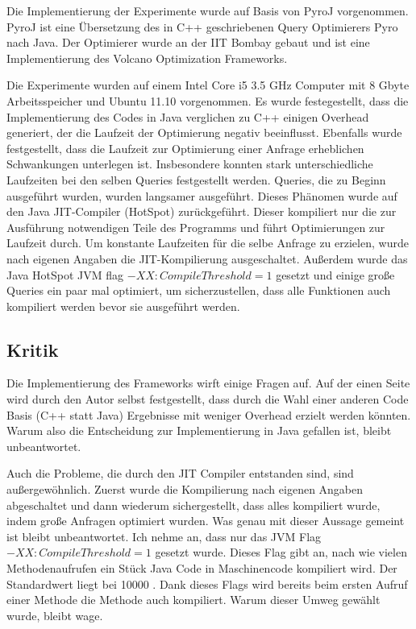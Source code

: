 Die Implementierung der Experimente wurde auf Basis von PyroJ vorgenommen. PyroJ ist eine Übersetzung des in C++ geschriebenen Query Optimierers Pyro nach Java. Der Optimierer wurde an der IIT Bombay gebaut und ist eine Implementierung des Volcano Optimization Frameworks.

Die Experimente wurden auf einem Intel Core i5 3.5 GHz Computer mit 8 Gbyte Arbeitsspeicher und Ubuntu 11.10 vorgenommen. Es wurde festegestellt, dass die Implementierung des Codes in Java verglichen zu C++ einigen Overhead generiert, der die Laufzeit der Optimierung negativ beeinflusst. Ebenfalls wurde festgestellt, dass die Laufzeit zur Optimierung einer Anfrage erheblichen Schwankungen unterlegen ist. Insbesondere konnten stark unterschiedliche Laufzeiten bei den selben Queries festgestellt werden. Queries, die zu Beginn ausgeführt wurden, wurden langsamer ausgeführt. Dieses Phänomen wurde auf den Java JIT-Compiler (HotSpot) zurückgeführt. Dieser kompiliert nur die zur Ausführung notwendigen Teile des Programms und führt Optimierungen zur Laufzeit durch. Um konstante Laufzeiten für die selbe Anfrage zu erzielen, wurde nach eigenen Angaben die JIT-Kompilierung ausgeschaltet. Außerdem wurde das Java HotSpot JVM flag $-XX:CompileThreshold=1$ gesetzt und einige große Queries ein paar mal optimiert, um sicherzustellen, dass alle Funktionen auch kompiliert werden bevor sie ausgeführt werden.
 

\subsection{Kritik} 


Die Implementierung des Frameworks wirft einige Fragen auf. Auf der einen Seite wird durch den Autor selbst festgestellt, dass durch die Wahl einer anderen Code Basis (C++ statt Java) Ergebnisse mit weniger Overhead erzielt werden könnten. Warum also die Entscheidung zur Implementierung in Java gefallen ist, bleibt unbeantwortet.

Auch die Probleme, die durch den JIT Compiler entstanden sind, sind außergewöhnlich. Zuerst wurde die Kompilierung nach eigenen Angaben abgeschaltet und dann wiederum sichergestellt, dass alles kompiliert wurde, indem große Anfragen optimiert wurden. Was genau mit dieser Aussage gemeint ist bleibt unbeantwortet.  Ich nehme an, dass nur das JVM Flag $-XX:CompileThreshold=1$ gesetzt wurde. Dieses Flag gibt an, nach wie vielen Methodenaufrufen ein Stück Java Code in Maschinencode kompiliert wird. Der Standardwert liegt bei 10000 \cite{oracle2015VMOptions}. Dank dieses Flags wird bereits beim ersten Aufruf einer Methode die Methode auch kompiliert. Warum dieser Umweg gewählt wurde, bleibt wage.

